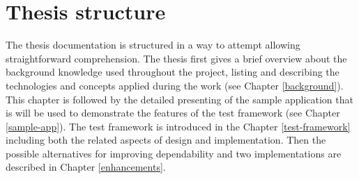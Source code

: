 \section{Thesis structure}

The thesis documentation is structured in a way to attempt allowing straightforward comprehension. The thesis first gives a brief overview about the background knowledge used throughout the project, listing and describing the technologies and concepts applied during the work (see Chapter \ref{background}). This chapter is followed by the detailed presenting of the sample application that is will be used to demonstrate the features of the test framework (see Chapter \ref{sample-app}). The test framework is introduced in the Chapter \ref{test-framework} including both the related aspects of design and implementation. Then the possible alternatives for improving dependability and two implementations are described in Chapter \ref{enhancements}.


























